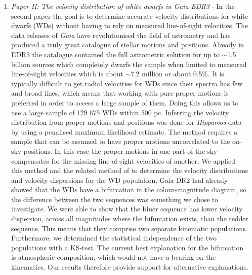\begin{enumerate}
    \item \textit{Paper II: The velocity distribution of white dwarfs in Gaia EDR3} - In the second paper the goal is to determine accurate velocity distributions for white dwarfs (WDs) without having to rely on measured line-of-sight velocities. The data releases of \textit{Gaia} have revolutionised the field of astrometry and has produced a truly great catalogue of stellar motions and positions. Already in EDR3 the catalogue contained the full astrometric solution for up to ${\sim}$1.5 billion sources which completely dwarfs the sample when limited to measured line-of-sight velocities which is about ${\sim}$7.2 million or about 0.5\%. It is typically difficult to get radial velocities for WDs since their spectra has few and broad lines, which means that working with pure proper motions is preferred in order to access a large sample of them. Doing this allows us to use a large sample of 129 675 WDs within 500 pc. Inferring the velocity distribution from proper motions and positions was done for \textit{Hipparcos} data by \cite{dehnen:98a} using a penalised maximum likelihood estimate. The method requires a sample that can be assumed to have proper motions uncorrelated to the on-sky positions. In this case the proper motions in one part of the sky compensates for the missing line-of-sight velocities of another. We applied this method and the related method of \cite{dehnen:98b} to determine the velocity distributions and velocity dispersions for the WD population. Gaia DR2 had already showed that the WDs have a bifurcation in the colour-magnitude diagram, so the difference between the two sequences was something we chose to investigate. We were able to show that the bluer sequence has lower velocity dispersion, across all magnitudes where the bifurcation exists, than the redder sequence. This means that they comprise two separate kinematic populations. Furthermore, we determined the statistical independence of the two populations with a KS-test. The current best explanation for the bifurcation is atmospheric composition, which would not have a bearing on the kinematics. Our results therefore provide support for alternative explanations. 
        

\end{enumerate}
